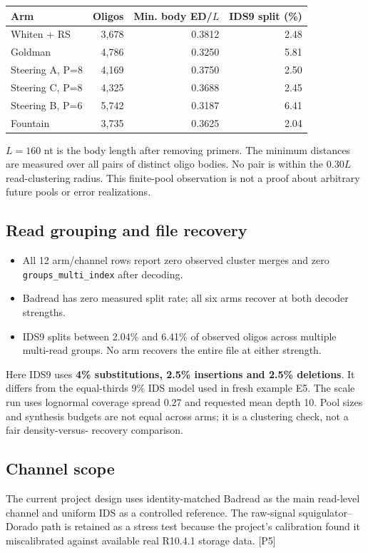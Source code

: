 \documentclass[11pt,a4paper]{article}
\begin{document}
{\small\begin{tabularx}{\linewidth}{Yrrr}
\toprule Arm & Oligos & Min. body ED/$L$ & IDS9 split (\%)\\\midrule
Whiten + RS & 3,678 & 0.3812 & 2.48 \\
Goldman & 4,786 & 0.3250 & 5.81 \\
Steering A, P=8 & 4,169 & 0.3750 & 2.50 \\
Steering C, P=8 & 4,325 & 0.3688 & 2.45 \\
Steering B, P=6 & 5,742 & 0.3187 & 6.41 \\
Fountain & 3,735 & 0.3625 & 2.04 \\
\bottomrule\end{tabularx}}
$L=160$ nt is the body length after removing primers. The minimum distances are
measured over all pairs of distinct oligo bodies. No pair is within the $0.30L$
read-clustering radius. This finite-pool observation is not a proof about arbitrary
future pools or error realizations.

\subsection*{Read grouping and file recovery}
\begin{itemize}
\item All 12 arm/channel rows report zero observed cluster merges and zero
  \texttt{groups\_multi\_index} after decoding.
\item Badread has zero measured split rate; all six arms recover at both decoder strengths.
\item IDS9 splits between 2.04\% and 6.41\% of observed oligos across multiple
  multi-read groups. No arm recovers the entire file at either strength.
\end{itemize}
Here IDS9 uses \textbf{4\% substitutions, 2.5\% insertions and 2.5\% deletions}.
It differs from the equal-thirds 9\% IDS model used in fresh example E5. The scale run
uses lognormal coverage spread 0.27 and requested mean depth 10. Pool sizes and synthesis
budgets are not equal across arms; it is a clustering check, not a fair density-versus-
recovery comparison.

\subsection*{Channel scope}
The current project design uses identity-matched Badread as the main read-level
channel and uniform IDS as a controlled reference. The raw-signal
squigulator--Dorado path is retained as a stress test because the project's calibration
found it miscalibrated against available real R10.4.1 storage data. [P5]
\end{document}
